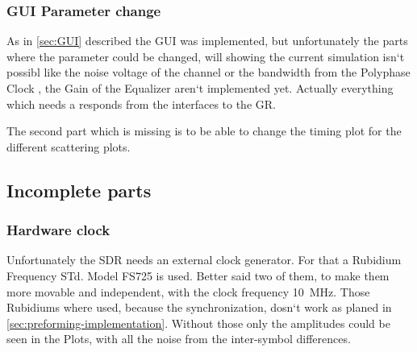 \subsubsection{GUI Parameter change}
As in \ref{sec:GUI} described the GUI was implemented, but unfortunately the parts where the parameter could be changed, will showing the current simulation isn`t possibl
 like the noise voltage of the channel or the bandwidth from the Polyphase Clock , the Gain of the Equalizer aren`t implemented yet. Actually everything which needs a responds from the interfaces to the GR. 

The second part which is missing is to be able to change the timing plot for the different scattering plots.

%	

\subsection{Incomplete parts}

\subsubsection{Hardware clock}
Unfortunately the SDR needs an external clock generator. For that a Rubidium Frequency STd. Model FS725 is used. Better said two of them, to make them more movable and independent, with the clock frequency \SI{10}{\mega\hertz}. Those Rubidiums where used, because the synchronization, dosn`t work as planed in \ref{sec:preforming-implementation}. 
Without those only the amplitudes could be seen in the Plots, with all the noise from the inter-symbol differences. 



